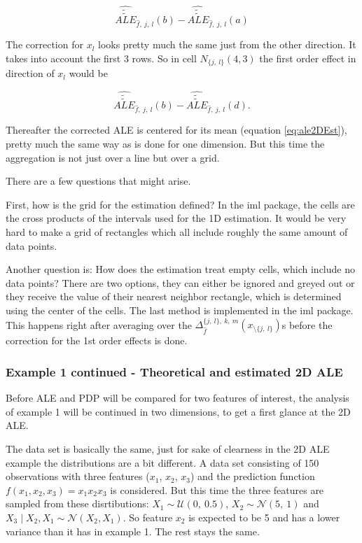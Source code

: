 \documentclass[
]{krantz}
\begin{document}
\[ \widehat{\widetilde{\widetilde{ALE}}}_{\hat{f},~j,~l}(b) - \widehat{\widetilde{\widetilde{ALE}}}_{\hat{f},~j,~l}(a)\]

The correction for \(x_l\) looks pretty much the same just from the other direction. It takes into account the first 3 rows. So in cell \(N_{\{j,~l\}}(4,3)\) the first order effect in direction of \(x_l\) would be

\[ \widehat{\widetilde{\widetilde{ALE}}}_{\hat{f},~j,~l}(b) - \widehat{\widetilde{\widetilde{ALE}}}_{\hat{f},~j,~l}(d). \]

Thereafter the corrected ALE is centered for its mean (equation \eqref{eq:ale2DEst}), pretty much the same way as is done for one dimension. But this time the aggregation is not just over a line but over a grid.

There are a few questions that might arise.

First, how is the grid for the estimation defined? In the iml package, the cells are the cross products of the intervals used for the 1D estimation. It would be very hard to make a grid of rectangles which all include roughly the same amount of data points.

Another question is: How does the estimation treat empty cells, which include no data points? There are two options, they can either be ignored and greyed out or they receive the value of their nearest neighbor rectangle, which is determined using the center of the cells. The last method is implemented in the iml package. This happens right after averaging over the \(\Delta_{\hat f}^{{\{j,~l\}}, ~k,~m} (x_{\setminus\{j,~l\}})\)s before the correction for the 1st order effects is done.

\hypertarget{example-1-continued---theoretical-and-estimated-2d-ale}{%
\subsubsection{Example 1 continued - Theoretical and estimated 2D ALE}\label{example-1-continued---theoretical-and-estimated-2d-ale}}

Before ALE and PDP will be compared for two features of interest, the analysis of example 1 will be continued in two dimensions, to get a first glance at the 2D ALE.

The data set is basically the same, just for sake of clearness in the 2D ALE example the distributions are a bit different.
A data set consisting of 150 observations with three features (\(x_1\), \(x_2\), \(x_3\)) and the prediction function \(f(x_1, x_2, x_3) = x_1 x_2 x_3\) is considered.
But this time the three features are sampled from these disrtibutions:
\(X_1 \sim \mathcal{U}(0,~0.5)\), \(X_2 \sim \mathcal{N}(5,~1)\) and \(X_3\mid X_2, X_1 \sim \mathcal{N}(X_2,X_1)\).
So feature \(x_2\) is expected to be 5 and has a lower variance than it has in example 1. The rest stays the same.
\end{document}
